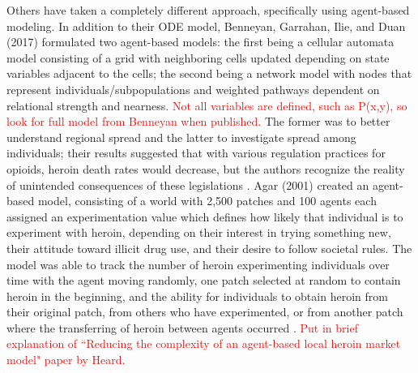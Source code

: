 \documentclass[12pt]{article}
\begin{document}
Others have taken a completely different approach, specifically using agent-based modeling. In addition to their ODE model, Benneyan, Garrahan, Ilie, and Duan (2017) formulated two agent-based models: the first being a cellular automata model consisting of a grid with neighboring cells updated depending on state variables adjacent to the cells; the second being a network model with nodes that represent individuals/subpopulations and weighted pathways dependent on relational strength and nearness. \textcolor{red}{Not all variables are defined, such as P(x,y), so look for full model from Benneyan when published.} The former was to better understand regional spread and the latter to investigate spread among individuals; their results suggested that with various regulation practices for opioids, heroin death rates would decrease, but the authors recognize the reality of unintended consequences of these legislations \cite{Benneyan}. Agar (2001) created an agent-based model, consisting of a world with 2,500 patches and 100 agents each assigned an experimentation value which defines how likely that individual is to experiment with heroin, depending on their interest in trying something new, their attitude toward illicit drug use, and their desire to follow societal rules. The model was able to track the number of heroin experimenting individuals over time with the agent moving randomly, one patch selected at random to contain heroin in the beginning, and the ability for individuals to obtain heroin from their original patch, from others who have experimented, or from another patch where the transferring of heroin between agents occurred \cite{Agar}. \textcolor{red}{Put in brief explanation of ``Reducing the complexity of an agent-based local heroin market model" paper by Heard. \\ } \\
\end{document}
